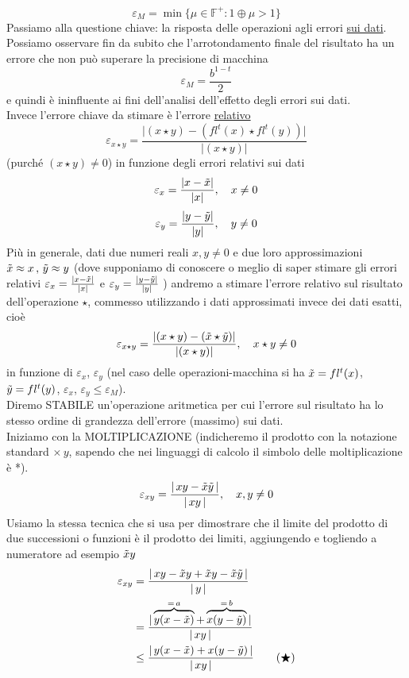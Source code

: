 \documentclass[12pt]{article}
\begin{document}
\[ \varepsilon_M = \min \{\mu \in \mathbb{F}^+ : 1 \oplus \mu > 1\} \]
Passiamo alla questione chiave: la risposta delle operazioni agli errori \underline{sui dati}.\\
Possiamo osservare fin da subito che l’arrotondamento finale del risultato ha un errore che non può superare la precisione di macchina \[ \varepsilon_M = \frac{b^{1-t}}{2}\]
e quindi è ininfluente ai fini dell'analisi dell'effetto degli errori sui dati. \\
Invece l’errore chiave da stimare è l’errore \underline{relativo} 
\[ \varepsilon_{x \star y} = \frac{\lvert (x \star y) - (fl^t (x) \star fl^t (y)) \rvert}{\lvert (x \star y) \rvert} \]
(purché $(x \star y) \ne 0$) in funzione degli errori relativi sui dati
\[ \varepsilon_x = \frac{\lvert x - \Tilde{x} \rvert}{\lvert x \rvert}, \quad x \ne 0 \]
\[ \varepsilon_y = \frac{\lvert y - \Tilde{y} \rvert}{\lvert y \rvert}, \quad y \ne 0 \]
Più in generale, dati due numeri reali $x, y \ne 0$ e due loro approssimazioni $\Tilde{x} \approx x\,,\, \Tilde{y} \approx y$ (dove supponiamo di conoscere o meglio di saper stimare gli errori relativi $ \varepsilon_x = \frac{\lvert x - \Tilde{x} \rvert}{\lvert x \rvert}$ e $ \varepsilon_y = \frac{\lvert y - \Tilde{y} \rvert}{\lvert y \rvert}$ ) andremo a stimare l’errore relativo sul risultato dell'operazione $\star$, commesso utilizzando i dati approssimati invece dei dati esatti, cioè
\[ \varepsilon_{x \star y} = \frac{\lvert (x \star y) - (\Tilde{x} \star \Tilde{y}) \rvert}{\lvert (x \star y) \rvert}, \quad x \star y \ne 0 \]
in funzione di $\varepsilon_x$, $\varepsilon_y$ (nel caso delle operazioni-macchina si ha $\Tilde{x} = fl^t(x)$, $\Tilde{y} = fl^t(y)$, $\varepsilon_x$, $\varepsilon_y \le \varepsilon_M$).\\
Diremo STABILE un’operazione aritmetica per cui l’errore sul risultato ha lo stesso ordine di grandezza dell'errore (massimo) sui dati.\\
Iniziamo con la MOLTIPLICAZIONE (indicheremo il prodotto con la notazione standard $\times \, y$, sapendo che nei linguaggi di calcolo il simbolo delle moltiplicazione è *).
\[ \varepsilon_{xy} = \frac{\lvert \, xy - \Tilde{x}\Tilde{y} \, \rvert}{\lvert \, xy \, \rvert}, \quad x , y \ne 0 \]
Usiamo la stessa tecnica che si usa per dimostrare che il limite del prodotto di due successioni o funzioni è il prodotto dei limiti, aggiungendo e togliendo a numeratore ad esempio $\Tilde{x}y$
\[\begin{split}
    \varepsilon_{xy} & = \frac{\lvert \, xy - \Tilde{x}y + \Tilde{x}y - \Tilde{x}\Tilde{y} \, \rvert}{\lvert \, y \, \rvert} \\
    & = \frac{\lvert \, \overbrace{y(x - \Tilde{x})}^{=\,a} + \overbrace{x(y - \Tilde{y})}^{=\,b} \, \rvert}{\lvert\, xy \, \rvert} \\
    & \le \frac{\lvert \, y(x - \Tilde{x}) + x(y - \Tilde{y}) \, \rvert}{\lvert \, xy \, \rvert} \quad \quad (\bigstar) 
\end{split}\]
\end{document}
